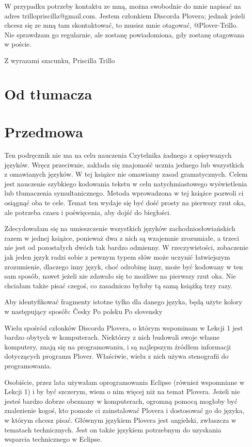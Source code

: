 \documentclass[12p, oneside]{book}
\begin{document}
W przypadku potrzeby kontaktu ze mną, można swobodnie do mnie napisać na adres trillopriscilla@gmail.com. Jestem członkiem Discorda Plovera; jednak jeżeli chcesz się ze mną tam skontaktować, to musisz mnie otagować, @Plover-Trillo. Nie sprawdzam go regularnie, ale zostanę powiadomiona, gdy zostanę otagowana w poście.


Z wyrazami szacunku,
Priscilla Trillo

\newpage
\section{Od tłumacza}

\newpage
\section{Przedmowa}
Ten podręcznik nie ma na celu nauczenia Czytelnika żadnego z opisywanych języków. Wręcz przeciwnie, zakłada się znajomość ucznia jednego lub wszystkich z omawianych języków. W tej książce nie omawiamy zasad gramatycznych. Celem jest nauczenie szybkiego kodowania tekstu w celu natychmiastowego wyświetlenia lub tłumaczenia symultanicznego. Metoda wprowadzona w tej książce pozwoli ci osiągnąć oba te cele. Temat ten wydaje się być dość prosty na pierwszy rzut oka, ale potrzeba czasu i poświęcenia, aby dojść do biegłości.

Zdecydowałam się na umieszczenie wszystkich języków zachodniosłowiańskich razem w jednej książce, ponieważ dwa z nich są wzajemnie zrozumiałe, a trzeci nie jest od pozostałych dwóch tak bardzo odmienny. W rzeczywistości, zobaczenie jak jeden język radzi sobie z pewnym typem słów może uczynić łatwiejszym zrozumienie, dlaczego inny język, choć odrobinę inny, może być kodowany w ten sam sposób, nawet jeżeli nie zdawało się to możliwe na pierwszy rzut oka. Nie chciałam także pisać czegoś, co zasadniczo byłoby tą samą książką trzy razy.

Aby identyfikować fragmenty istotne tylko dla danego języka, będą użyte kolory w następujący sposób:
Česky
Po polsku
Po slovensky

Wielu spośród członków Discorda Plovera, o którym wspominam w Lekcji 1 jest bardzo obytych w komputerach. Niektórzy z nich budowali swoje własne komputery, znają się na programowaniu, i są najlepszym źródłem informacji dotyczących programu Plover. Właściwie, wielu z nich używa stenografii do programowania.

Osobiście, przez lata używałam oprogramowania Eclipse (również wspomniane w Lekcji 1) i by być szczerym, wiem o nim więcej niż na temat Plovera. Jeżeli nie jesteś bardzo dobrze obeznany w komputerach, ogromną pomocą mogłoby być znalezienie kogoś, kto pomoże ci zainstalować Plovera i dostosować go do języka, w którym chcesz pisać. Głównym językiem Plovera jest angielski, zwłaszcza w tematach technicznych. Jest on także językiem potrzebnym do uzyskania wsparcia technicznego w Eclipse.
\end{document}
